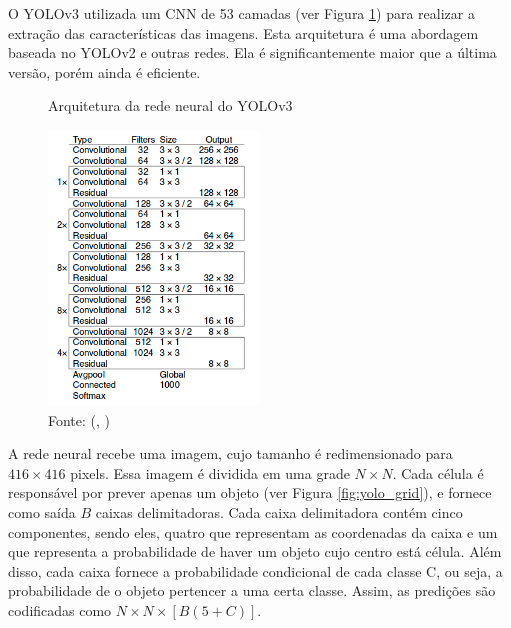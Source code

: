 \documentclass[]{politex}
\begin{document}
O YOLOv3 utilizada um CNN de 53 camadas (ver Figura \ref{fig:yolo_arquitetura}) para realizar a extração das características das imagens. Esta arquitetura é uma abordagem baseada no YOLOv2 e outras redes. Ela é significantemente maior que a última versão, porém ainda é eficiente.

\begin{figure}[H]
    \centering
    \caption{Arquitetura da rede neural do YOLOv3}
    \includegraphics[width=0.5\textwidth]{Arquitetura_YOLOv3}
    \caption*{Fonte: (, \citeyear{yolov3})}
    \label{fig:yolo_arquitetura}
\end{figure}

A rede neural recebe uma imagem, cujo tamanho é redimensionado para \(416 \times 416\) pixels. Essa imagem é dividida em uma grade \(N \times N\). Cada célula é responsável por prever apenas um objeto (ver Figura \ref{fig:yolo_grid}), e fornece como saída \(B\) caixas delimitadoras. Cada caixa delimitadora contém cinco componentes, sendo eles, quatro que representam as coordenadas da caixa e um que representa a probabilidade de haver um objeto cujo centro está célula. Além disso, cada caixa fornece a probabilidade condicional de cada classe C, ou seja, a probabilidade de o objeto pertencer a uma certa classe. Assim, as predições são codificadas como \(N \times N \times [B(5+C)]\).
\end{document}
